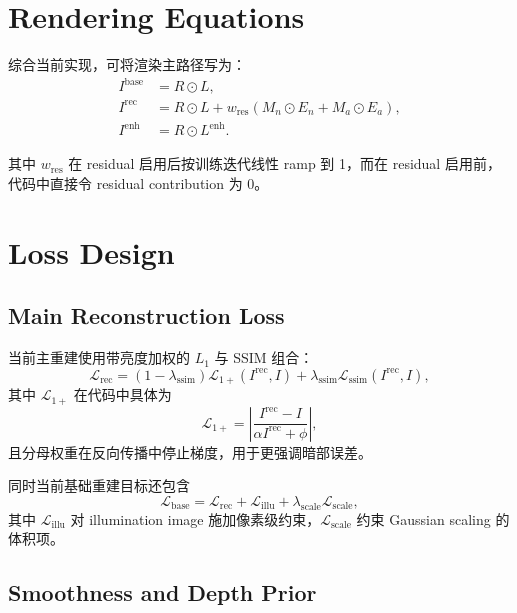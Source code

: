 \documentclass[11pt]{article}
\begin{document}
\section{Rendering Equations}

综合当前实现，可将渲染主路径写为：
\begin{align}
    I^{\text{base}} &= R \odot L, \\
    I^{\text{rec}}  &= R \odot L + w_{\text{res}} (M_n \odot E_n + M_a \odot E_a), \\
    I^{\text{enh}}  &= R \odot L^{\text{enh}}.
\end{align}

其中 $w_{\text{res}}$ 在 residual 启用后按训练迭代线性 ramp 到 1，而在 residual 启用前，代码中直接令 residual contribution 为 0。

\section{Loss Design}

\subsection{Main Reconstruction Loss}

当前主重建使用带亮度加权的 $L_1$ 与 SSIM 组合：
\begin{equation}
    \mathcal{L}_{\text{rec}}
    =
    (1-\lambda_{\text{ssim}})\mathcal{L}_{1+}(I^{\text{rec}}, I)
    +
    \lambda_{\text{ssim}}\mathcal{L}_{\text{ssim}}(I^{\text{rec}}, I),
\end{equation}
其中 $\mathcal{L}_{1+}$ 在代码中具体为
\begin{equation}
    \mathcal{L}_{1+}
    =
    \left|
        \frac{I^{\text{rec}} - I}{\alpha I^{\text{rec}} + \phi}
    \right|,
\end{equation}
且分母权重在反向传播中停止梯度，用于更强调暗部误差。

同时当前基础重建目标还包含
\begin{equation}
    \mathcal{L}_{\text{base}}
    =
    \mathcal{L}_{\text{rec}}
    +
    \mathcal{L}_{\text{illu}}
    +
    \lambda_{\text{scale}}\mathcal{L}_{\text{scale}},
\end{equation}
其中 $\mathcal{L}_{\text{illu}}$ 对 illumination image 施加像素级约束，$\mathcal{L}_{\text{scale}}$ 约束 Gaussian scaling 的体积项。

\subsection{Smoothness and Depth Prior}
\end{document}
